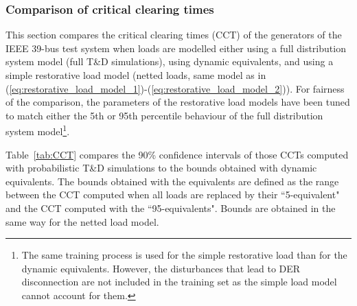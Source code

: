 \subsubsection{Comparison of critical clearing times}
\label{sec:isgt_results_CCT}

This section compares the critical clearing times (CCT) of the generators of the IEEE 39-bus test system when loads are modelled either using a full distribution system model (full T\&D simulations), using dynamic equivalents, and using a simple restorative load model (netted loads, same model as in (\ref{eq:restorative_load_model_1})-(\ref{eq:restorative_load_model_2})). For fairness of the comparison, the parameters of the restorative load models have been tuned to match either the 5th or 95th percentile behaviour of the full distribution system model\footnote{The same training process is used for the simple restorative load than for the dynamic equivalents. However, the disturbances that lead to DER disconnection are not included in the training set as the simple load model cannot account for them.}.




Table~\ref{tab:CCT} compares the 90\% confidence intervals of those CCTs computed with probabilistic T\&D simulations to the bounds obtained with dynamic equivalents. The bounds obtained with the equivalents are defined as the range between the CCT computed when all loads are replaced by their ``5-equivalent" and the CCT computed with the ``95-equivalents". Bounds are obtained in the same way for the netted load model.


